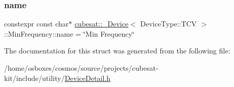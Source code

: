\subsubsection{\texorpdfstring{name}{name}}
{\footnotesize\ttfamily constexpr const char$\ast$ \hyperlink{structcubesat_1_1__Device}{cubesat\+::\+\_\+\+Device}$<$ Device\+Type\+::\+T\+CV $>$\+::Min\+Frequency\+::name = \char`\"{}Min Frequency\char`\"{}\hspace{0.3cm}{\ttfamily [static]}}



The documentation for this struct was generated from the following file\+:\begin{DoxyCompactItemize}
\item 
/home/osboxes/cosmos/source/projects/cubesat-\/kit/include/utility/\hyperlink{DeviceDetail_8h}{Device\+Detail.\+h}\end{DoxyCompactItemize}
